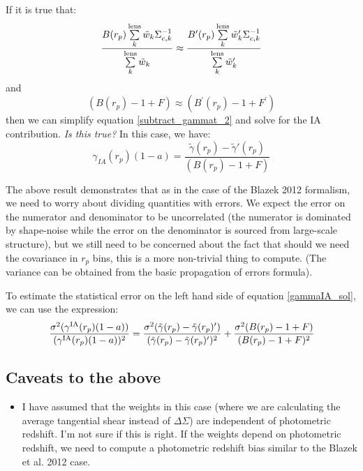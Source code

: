 \documentclass[onecolumn,amsmath,aps,fleqn, superscriptaddress]{revtex4}
\begin{document}
If it is true that:
\begin{equation}
\frac{B(r_p) \sum\limits_{k}^{\rm lens} \tilde{w}_k \Sigma_{c,k}^{-1}}{\sum\limits_{k}^{\rm lens} \tilde{w}_k} \approx \frac{B^\prime(r_p) \sum\limits_{k}^{\rm lens} \tilde{w}^\prime_k \Sigma_{c,k}^{-1}}{\sum\limits_{k}^{\rm lens} \tilde{w}^\prime_k}
\label{lens_req}
\end{equation}
and
\begin{equation}
(B(r_p)-1+F) \approx (B^\prime(r_p)-1+F^\prime)
\label{ia_req}
\end{equation}
then we can simplify equation \ref{subtract_gammat_2} and solve for the IA contribution. {\it Is this true?} In this case, we have:
\begin{equation}
\gamma_{IA}(r_p)(1-a) = \frac{\tilde{\gamma}(r_p) - \tilde{\gamma}'(r_p)}{(B(r_p)-1+F)}
\label{gammaIA_sol}
\end{equation}

The above result demonstrates that as in the case of the Blazek 2012 formalism, we need to worry about dividing quantities with errors. We expect the error on the numerator and denominator to be uncorrelated (the numerator is dominated by shape-noise while the error on the denominator is sourced from large-scale structure), but we still need to be concerned about the fact that should we need the covariance in $r_p$ bins, this is a more non-trivial thing to compute. (The variance can be obtained from the basic propagation of errors formula).

To estimate the statistical error on the left hand side of equation \ref{gammaIA_sol}, we can use the expression:
\begin{equation}
\frac{\sigma^2(\gamma^{\rm IA}(r_p)(1-a))}{(\gamma^{\rm IA}(r_p)(1-a))^2} = \frac{\sigma^2(\tilde{\gamma}(r_p) - \tilde{\gamma}(r_p)^\prime)}{(\tilde{\gamma}(r_p) - \tilde{\gamma}(r_p)^\prime)^2} + \frac{\sigma^2(B(r_p)-1+F)}{(B(r_p)-1+F)^2}
\label{error_gt}
\end{equation}

\subsection*{Caveats to the above}
\begin{itemize}
\item{I have assumed that the weights in this case (where we are calculating the average tangential shear instead of $\Delta \Sigma$) are independent of photometric redshift. I'm not sure if this is right. If the weights depend on photometric redshift, we need to compute a photometric redshift bias similar to the Blazek et al. 2012 case.}
\end{itemize}
\end{document}

